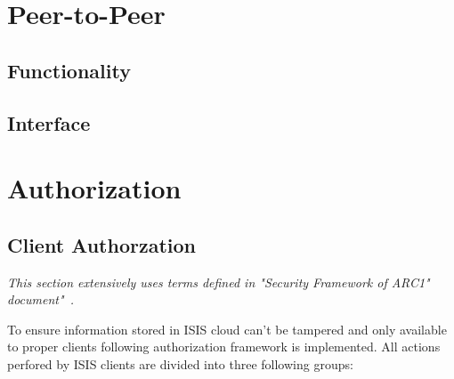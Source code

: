 \documentclass{book}
\begin{document}
\section{Peer-to-Peer}
\label{sec:isis_peer_to_peer}

\subsection{Functionality}
\label{sub:peer_to_peer_functionality}


\subsection{Interface}
\label{sub:isis_peer_to_peer_interface}



\section{Authorization}
\label{sec:isis_authorization}

\subsection{Client Authorzation}
\label{sub:isis_authorization_client_authorization}


\textit{This section extensively uses terms defined in "Security Framework of ARC1" document"~\cite{arcsec}.}

To ensure information stored in ISIS cloud can't be tampered and only available to proper clients following authorization framework is implemented. All actions perfored by ISIS clients are divided into three following groups:
\end{document}
